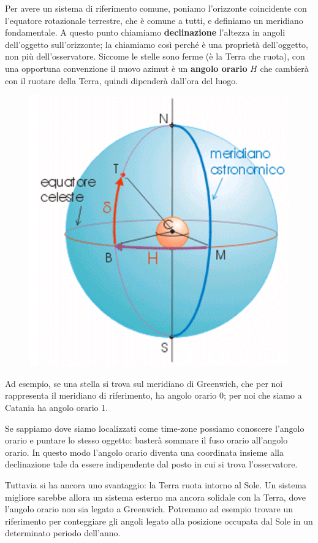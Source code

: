 Per avere un sistema di riferimento comune, poniamo l'orizzonte coincidente con l'equatore rotazionale terrestre, che è comune a tutti, e definiamo un meridiano fondamentale. A questo punto chiamiamo \textbf{declinazione} l'altezza in angoli dell'oggetto sull'orizzonte; la chiamiamo così perché è una proprietà dell'oggetto, non più dell'osservatore. Siccome le stelle sono ferme (è la Terra che ruota), con una opportuna convenzione il nuovo azimut è un \textbf{angolo orario} $H$ che cambierà con il ruotare della Terra, quindi dipenderà dall'ora del luogo.

\begin{minipage}{0.345\textwidth}
    \begin{figure}[H]
        \centering
        \includegraphics[width=5 cm]{Coordinate orarie.png}
    \end{figure}
\end{minipage}
\begin{minipage}{0.65\textwidth}
    \vspace{0.5cm}Ad esempio, se una stella si trova sul meridiano di Greenwich, che per noi rappresenta il meridiano di riferimento, ha angolo orario 0; per noi che siamo a Catania ha angolo orario 1.

    Se sappiamo dove siamo localizzati come time-zone possiamo conoscere l'angolo orario e puntare lo stesso oggetto: basterà sommare il fuso orario all'angolo orario. In questo modo l'angolo orario diventa una coordinata insieme alla declinazione tale da essere indipendente dal posto in cui si trova l'osservatore.
\end{minipage}

\vspace{0.2cm}Tuttavia si ha ancora uno svantaggio: la Terra ruota intorno al Sole. Un sistema migliore sarebbe allora un sistema esterno ma ancora solidale con la Terra, dove l'angolo orario non sia legato a Greenwich. Potremmo ad esempio trovare un riferimento per conteggiare gli angoli legato alla posizione occupata dal Sole in un determinato periodo dell'anno.

